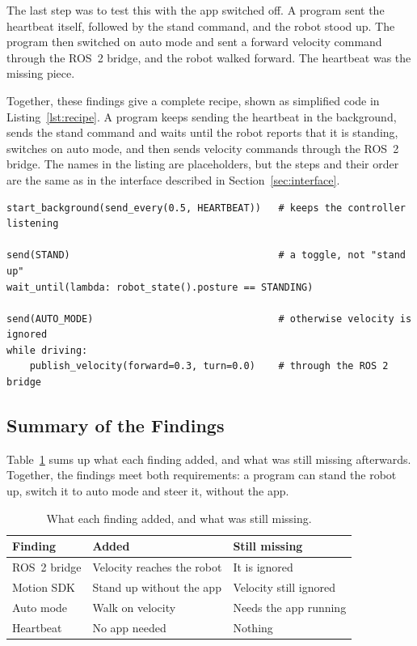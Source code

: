 The last step was to test this with the app switched off. A program sent the heartbeat itself, followed by
the stand command, and the robot stood up. The program then switched on auto mode and sent a forward
velocity command through the ROS~2 bridge, and the robot walked forward. The heartbeat was the missing
piece.

Together, these findings give a complete recipe, shown as simplified code in Listing~\ref{lst:recipe}. A
program keeps sending the heartbeat in the background, sends the stand command and waits until the robot
reports that it is standing, switches on auto mode, and then sends velocity commands through the ROS~2
bridge. The names in the listing are placeholders, but the steps and their order are the same as in the
interface described in Section~\ref{sec:interface}.

\begin{lstlisting}[float=htbp, captionpos=b, label=lst:recipe,
  caption={The recipe found in this section, as simplified code. The names are placeholders; the steps and their order are those of the interface.}]
start_background(send_every(0.5, HEARTBEAT))   # keeps the controller listening

send(STAND)                                    # a toggle, not "stand up"
wait_until(lambda: robot_state().posture == STANDING)

send(AUTO_MODE)                                # otherwise velocity is ignored
while driving:
    publish_velocity(forward=0.3, turn=0.0)    # through the ROS 2 bridge
\end{lstlisting}

\subsection{Summary of the Findings}
\label{sec:findings-summary}

Table~\ref{tab:findings} sums up what each finding added, and what was still missing afterwards. Together,
the findings meet both requirements: a program can stand the robot up, switch it to auto mode and steer it,
without the app.

\begin{table}[htbp]
\centering
\caption{What each finding added, and what was still missing.}
\label{tab:findings}
\begin{tabular}{@{}lll@{}}
\toprule
Finding & Added & Still missing \\
\midrule
ROS~2 bridge   & Velocity reaches the robot & It is ignored \\
Motion SDK     & Stand up without the app   & Velocity still ignored \\
Auto mode      & Walk on velocity           & Needs the app running \\
Heartbeat      & No app needed             & Nothing \\
\bottomrule
\end{tabular}
\end{table}

